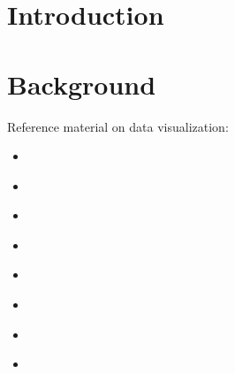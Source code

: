 \documentclass{l4proj}
\begin{document}
%
%
%
%
%
%
%
%
\chapter{Introduction}\label{ch:introduction}





\chapter{Background}\label{ch:background}

Reference material on data visualization:
\begin{itemize}
    \item \citep{bailey_using_2022}
    \item \citep{rougier_ten_2014}
    \item \citep{wilke_fundamentals_nodate}
    \item \citep{noauthor_python_nodate}
    \item \citep{noauthor_data_nodate}
    \item \citep{noauthor_scientific_2022}
    \item \citep{noauthor_scientific_2023}
    \item \citep{noauthor_data_2023}
\end{itemize}
\end{document}
